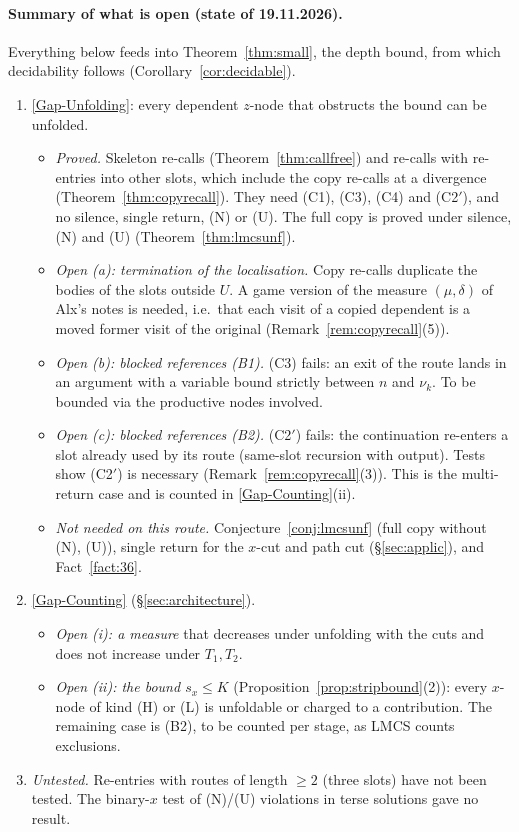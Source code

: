 \documentclass[11pt]{article}
\theoremstyle{plain}
\theoremstyle{definition}
\theoremstyle{remark}
\newcommand{\GapUnfolding}{\hyperref[gap:unfold]{[Gap-Unfolding]}}
\newcommand{\GapCounting}{\hyperref[gap:count]{[Gap-Counting]}}
\begin{document}
\paragraph{Summary of what is open (state of 19.11.2026).}
Everything below feeds into Theorem~\ref{thm:small}, the depth bound,
from which decidability follows (Corollary~\ref{cor:decidable}).
\begin{enumerate}
\item \GapUnfolding{}: every dependent $z$-node that obstructs the bound
  can be unfolded.
  \begin{itemize}
  \item \emph{Proved.}  Skeleton re-calls (Theorem~\ref{thm:callfree})
    and re-calls with re-entries into other slots, which include the
    copy re-calls at a divergence (Theorem~\ref{thm:copyrecall}).  They
    need (C1), (C3), (C4) and (C2$'$), and no silence, single return,
    (N) or (U).  The full copy is proved under silence, (N) and (U)
    (Theorem~\ref{thm:lmcsunf}).
  \item \emph{Open (a): termination of the localisation.}  Copy
    re-calls duplicate the bodies of the slots outside $U$.  A game
    version of the measure $(\mu,\delta)$ of Alx's notes is needed,
    i.e.\ that each visit of a copied dependent is a moved former visit
    of the original (Remark~\ref{rem:copyrecall}(5)).
  \item \emph{Open (b): blocked references (B1).}  (C3) fails: an exit
    of the route lands in an argument with a variable bound strictly
    between $n$ and $\nu_k$.  To be bounded via the productive nodes
    involved.
  \item \emph{Open (c): blocked references (B2).}  (C2$'$) fails: the
    continuation re-enters a slot already used by its route (same-slot
    recursion with output).  Tests show (C2$'$) is necessary
    (Remark~\ref{rem:copyrecall}(3)).  This is the multi-return case and
    is counted in \GapCounting{}(ii).
  \item \emph{Not needed on this route.}
    Conjecture~\ref{conj:lmcsunf} (full copy without (N), (U)), single
    return for the $x$-cut and path cut (\S\ref{sec:applic}), and
    Fact~\ref{fact:36}.
  \end{itemize}
\item \GapCounting{} (\S\ref{sec:architecture}).
  \begin{itemize}
  \item \emph{Open (i): a measure} that decreases under unfolding with
    the cuts and does not increase under $T_1,T_2$.
  \item \emph{Open (ii): the bound $s_x\le K$}
    (Proposition~\ref{prop:stripbound}(2)): every $x$-node of kind (H)
    or (L) is unfoldable or charged to a contribution.  The remaining
    case is (B2), to be counted per stage, as LMCS counts exclusions.
  \end{itemize}
\item \emph{Untested.}  Re-entries with routes of length $\ge2$
  (three slots) have not been tested.  The binary-$x$ test of (N)/(U)
  violations in terse solutions gave no result.
\end{enumerate}
\end{document}
